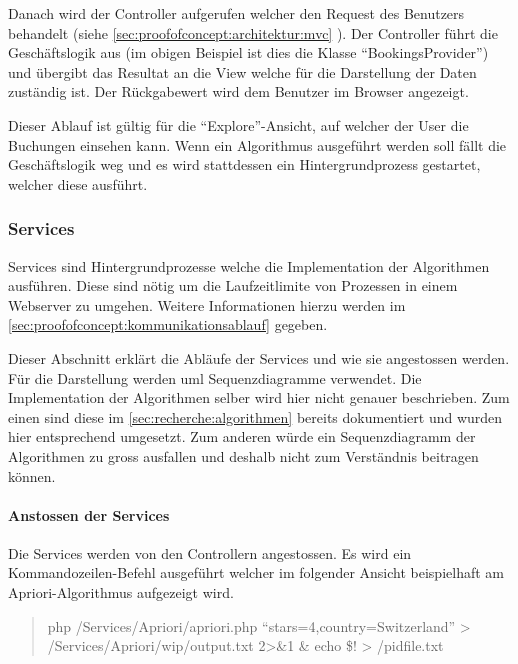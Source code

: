 Danach wird der Controller aufgerufen welcher den Request des Benutzers behandelt (siehe \cref{sec:proofofconcept:architektur:mvc} ). Der Controller führt die Geschäftslogik aus (im obigen Beispiel ist dies die Klasse "`BookingsProvider"') und übergibt das Resultat an die View welche für die Darstellung der Daten zuständig ist. Der Rückgabewert wird dem Benutzer im Browser angezeigt.

Dieser Ablauf ist gültig für die "`Explore"'-Ansicht, auf welcher der User die Buchungen einsehen kann. Wenn ein Algorithmus ausgeführt werden soll fällt die Geschäftslogik weg und es wird stattdessen ein Hintergrundprozess gestartet, welcher diese ausführt.

\subsubsection{Services}
\label{sec:proofofconcept:architektur:services}
Services sind Hintergrundprozesse welche die Implementation der Algorithmen ausführen. Diese sind nötig um die Laufzeitlimite von Prozessen in einem Webserver zu umgehen. Weitere Informationen hierzu werden im \cref{sec:proofofconcept:kommunikationsablauf} gegeben.

Dieser Abschnitt erklärt die Abläufe der Services und wie sie angestossen werden. Für die Darstellung werden \gls{uml} Sequenzdiagramme verwendet. Die Implementation der Algorithmen selber wird hier nicht genauer beschrieben. Zum einen sind diese im \cref{sec:recherche:algorithmen} bereits dokumentiert und wurden hier entsprechend umgesetzt. Zum anderen würde ein Sequenzdiagramm der Algorithmen zu gross ausfallen und deshalb nicht zum Verständnis beitragen können.


\paragraph{Anstossen der Services}
Die Services werden von den Controllern angestossen. Es wird ein Kommandozeilen-Befehl ausgeführt welcher im folgender Ansicht beispielhaft am Apriori-Algorithmus aufgezeigt wird.

\blockquote[]{
php /Services/Apriori/apriori.php ``stars=4,country=Switzerland'' > /Services/Apriori/wip/output.txt 2>\&1 \& echo \$! > /pidfile.txt
}

